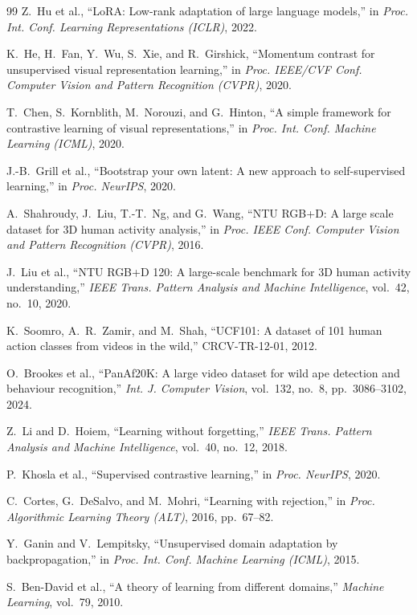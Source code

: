 \documentclass[preprint,12pt,number]{elsarticle}
\begin{document}
\begin{thebibliography}{99}
Z.~Hu et al., ``LoRA: Low-rank adaptation of large language models,'' in
\emph{Proc. Int. Conf. Learning Representations (ICLR)}, 2022.

K.~He, H.~Fan, Y.~Wu, S.~Xie, and R.~Girshick, ``Momentum contrast for
unsupervised visual representation learning,'' in \emph{Proc. IEEE/CVF Conf.
Computer Vision and Pattern Recognition (CVPR)}, 2020.

T.~Chen, S.~Kornblith, M.~Norouzi, and G.~Hinton, ``A simple framework
for contrastive learning of visual representations,'' in \emph{Proc. Int. Conf.
Machine Learning (ICML)}, 2020.

J.-B.~Grill et al., ``Bootstrap your own latent: A new approach to
self-supervised learning,'' in \emph{Proc. NeurIPS}, 2020.

A.~Shahroudy, J.~Liu, T.-T.~Ng, and G.~Wang, ``NTU RGB+D: A large scale
dataset for 3D human activity analysis,'' in \emph{Proc. IEEE Conf. Computer
Vision and Pattern Recognition (CVPR)}, 2016.

J.~Liu et al., ``NTU RGB+D 120: A large-scale benchmark for 3D human
activity understanding,'' \emph{IEEE Trans. Pattern Analysis and Machine
Intelligence}, vol.~42, no.~10, 2020.

K.~Soomro, A.~R.~Zamir, and M.~Shah, ``UCF101: A dataset of 101 human
action classes from videos in the wild,'' CRCV-TR-12-01, 2012.

O.~Brookes et al., ``PanAf20K: A large video dataset for wild ape
detection and behaviour recognition,'' \emph{Int. J. Computer Vision}, vol.~132,
no.~8, pp.~3086--3102, 2024.

Z.~Li and D.~Hoiem, ``Learning without forgetting,'' \emph{IEEE Trans. Pattern
Analysis and Machine Intelligence}, vol.~40, no.~12, 2018.

P.~Khosla et al., ``Supervised contrastive learning,'' in \emph{Proc. NeurIPS},
2020.

C.~Cortes, G.~DeSalvo, and M.~Mohri, ``Learning with rejection,'' in
\emph{Proc. Algorithmic Learning Theory (ALT)}, 2016, pp.~67--82.

Y.~Ganin and V.~Lempitsky, ``Unsupervised domain adaptation by backpropagation,''
in \emph{Proc. Int. Conf. Machine Learning (ICML)}, 2015.

S.~Ben-David et al., ``A theory of learning from different domains,''
\emph{Machine Learning}, vol.~79, 2010.


\end{thebibliography}
\end{document}

